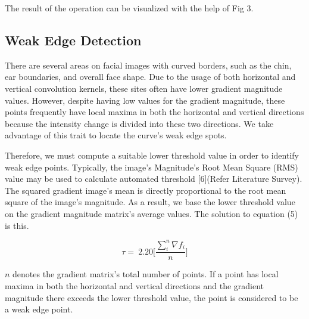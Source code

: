 \documentclass{70_styles/svproc}
\begin{document}
The result of the operation can be visualized with the help of Fig 3.

\subsection{Weak Edge Detection}
There are several areas on facial images with curved borders, such as the chin, ear boundaries, and overall face shape. Due to the usage of both horizontal and vertical convolution kernels, these sites often have lower gradient magnitude values. However, despite having low values for the gradient magnitude, these points frequently have local maxima in both the horizontal and vertical directions because the intensity change is divided into these two directions. We take advantage of this trait to locate the curve's weak edge spots.

Therefore, we must compute a suitable lower threshold value in order to identify weak edge points. Typically, the image's Magnitude's Root Mean Square (RMS) value may be used to calculate automated threshold [6](Refer Literature Survey). The squared gradient image's mean is directly proportional to the root mean square of the image's magnitude. As a result, we base the lower threshold value on the gradient magnitude matrix's average values. The solution to equation (5) is this.

\begin{equation}
    \tau =\ 2.20\Bigg[\frac{\sum_{i}^{n}\nabla{f_i}}{n}\Bigg]
\end{equation}

$n$ denotes the gradient matrix's total number of points. If a point has local maxima in both the horizontal and vertical directions and the gradient magnitude there exceeds the lower threshold value, the point is considered to be a weak edge point.
\end{document}
